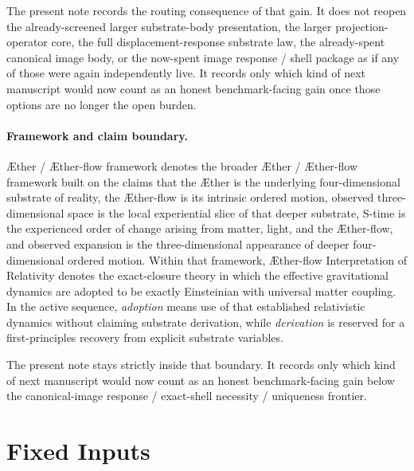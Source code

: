 \documentclass[11pt]{article}
\newcommand{\Aether}{\AE{}ther}
\newcommand{\Aflow}{\AE{}ther-flow}
\newcommand{\TheoryName}{\Aflow{} Interpretation of Relativity}
\newcommand{\TheoryProgram}{\Aether{} / \Aflow{} framework}
\begin{document}
The present note records the routing consequence of that gain. It does not reopen the already-screened larger substrate-body presentation, the larger projection-operator core, the full displacement-response substrate law, the already-spent canonical image body, or the now-spent image response / shell package as if any of those were again independently live. It records only which kind of next manuscript would now count as an honest benchmark-facing gain once those options are no longer the open burden.

\paragraph{Framework and claim boundary.}
\TheoryProgram{} denotes the broader \Aether{} / \Aflow{} framework built on the claims that the \Aether{} is the underlying four-dimensional substrate of reality, the \Aflow{} is its intrinsic ordered motion, observed three-dimensional space is the local experiential slice of that deeper substrate, S-time is the experienced order of change arising from matter, light, and the \Aflow{}, and observed expansion is the three-dimensional appearance of deeper four-dimensional ordered motion. Within that framework, \TheoryName{} denotes the exact-closure theory in which the effective gravitational dynamics are adopted to be exactly Einsteinian with universal matter coupling. In the active sequence, \emph{adoption} means use of that established relativistic dynamics without claiming substrate derivation, while \emph{derivation} is reserved for a first-principles recovery from explicit substrate variables.

The present note stays strictly inside that boundary. It records only which kind of next manuscript would now count as an honest benchmark-facing gain below the canonical-image response / exact-shell necessity / uniqueness frontier.

\section{Fixed Inputs}
\end{document}
